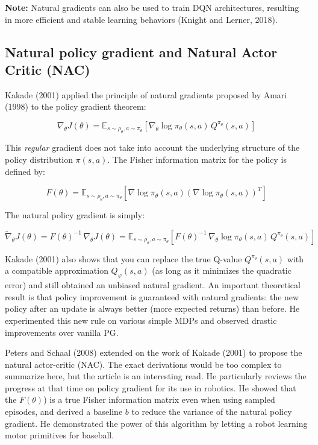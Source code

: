 \documentclass[
  letterpaper,
  DIV=11,
  numbers=noendperiod]{scrreprt}
\begin{document}
\textbf{Note:} Natural gradients can also be used to train DQN
architectures, resulting in more efficient and stable learning behaviors
(Knight and Lerner, 2018).

\hypertarget{natural-policy-gradient-and-natural-actor-critic-nac}{%
\subsection{Natural policy gradient and Natural Actor Critic
(NAC)}\label{natural-policy-gradient-and-natural-actor-critic-nac}}

Kakade (2001) applied the principle of natural gradients proposed by
Amari (1998) to the policy gradient theorem:

\[
    \nabla_\theta J(\theta) =  \mathbb{E}_{s \sim \rho_\theta, a \sim \pi_\theta}[\nabla_\theta \log \pi_\theta(s, a) \, Q^{\pi_\theta}(s, a)]
\]

This \emph{regular} gradient does not take into account the underlying
structure of the policy distribution \(\pi(s, a)\). The Fisher
information matrix for the policy is defined by:

\[
    F(\theta) = \mathbb{E}_{s \sim \rho_\theta, a \sim \pi_\theta}[ \nabla \log \pi_\theta(s, a)  (\nabla \log \pi_\theta(s, a))^T]
\]

The natural policy gradient is simply:

\[
    \tilde{\nabla}_\theta J(\theta) = F(\theta)^{-1} \, \nabla_\theta J(\theta)  = \mathbb{E}_{s \sim \rho_\theta, a \sim \pi_\theta}[ F(\theta)^{-1} \,  \nabla_\theta \log \pi_\theta(s, a) \, Q^{\pi_\theta}(s, a)]
\]

Kakade (2001) also shows that you can replace the true Q-value
\(Q^{\pi_\theta}(s, a)\) with a compatible approximation
\(Q_\varphi(s, a)\) (as long as it minimizes the quadratic error) and
still obtained an unbiased natural gradient. An important theoretical
result is that policy improvement is guaranteed with natural gradients:
the new policy after an update is always better (more expected returns)
than before. He experimented this new rule on various simple MDPs and
observed drastic improvements over vanilla PG.

Peters and Schaal (2008) extended on the work of Kakade (2001) to
propose the natural actor-critic (NAC). The exact derivations would be
too complex to summarize here, but the article is an interesting read.
He particularly reviews the progress at that time on policy gradient for
its use in robotics. He showed that the \(F(\theta)\)) is a true Fisher
information matrix even when using sampled episodes, and derived a
baseline \(b\) to reduce the variance of the natural policy gradient. He
demonstrated the power of this algorithm by letting a robot learning
motor primitives for baseball.
\end{document}
